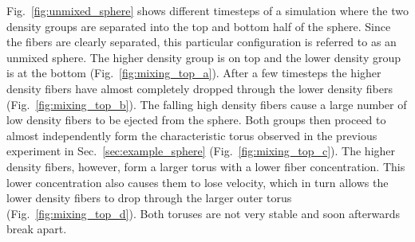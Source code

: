 Fig.~\ref{fig:unmixed_sphere} shows different timesteps of a simulation where the two density groups are separated into the top and bottom half of the sphere. Since the fibers are clearly separated, this particular configuration is referred to as an unmixed sphere. The higher density group is on top and the lower density group is at the bottom (Fig.~\ref{fig:mixing_top_a}). After a few timesteps the higher density fibers have almost completely dropped through the lower density fibers (Fig.~\ref{fig:mixing_top_b}). The falling high density fibers cause a large number of low density fibers to be ejected from the sphere. Both groups then proceed to almost independently form the characteristic torus observed in the previous experiment in Sec.~\ref{sec:example_sphere} (Fig.~\ref{fig:mixing_top_c}). The higher density fibers, however, form a larger torus with a lower fiber concentration. This lower concentration also causes them to lose velocity, which in turn allows the lower density fibers to drop through the larger outer torus (Fig.~\ref{fig:mixing_top_d}). Both toruses are not very stable and soon afterwards break apart.

